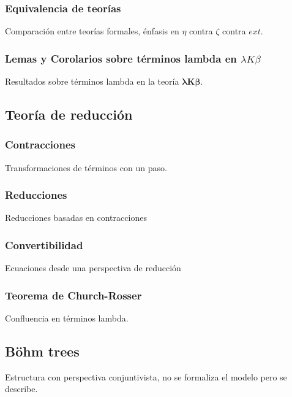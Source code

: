 \subsubsection{Equivalencia de teorías}

Comparación entre teorías formales, énfasis en \(\eta\) contra \(\zeta\) contra \(ext\).

\subsubsection{Lemas y Corolarios sobre términos lambda en \(\lambda K \beta\)}

Resultados sobre términos lambda en la teoría \(\boldsymbol{\lambda K \beta}\).

\subsection{Teoría de reducción}

\subsubsection{Contracciones}

Transformaciones de términos con un paso.

\subsubsection{Reducciones}

Reducciones basadas en contracciones

\subsubsection{Convertibilidad}

Ecuaciones desde una perspectiva de reducción

\subsubsection{Teorema de Church-Rosser}

Confluencia en términos lambda.

\subsection{Böhm trees}

Estructura con perspectiva conjuntivista, no se formaliza el modelo pero se
describe.

